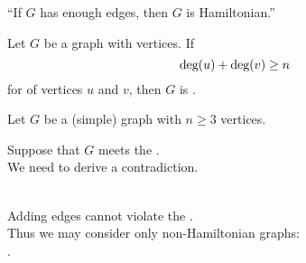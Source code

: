 
\begin{frame}{}

  \begin{center}
    ``If $G$ has enough edges, then $G$ is Hamiltonian.''
  \end{center}
\end{frame}

\begin{frame}{}
  \begin{theorem}
    Let $G$ be a  graph with  vertices. If
    \[
      \text{deg}(u) + \text{deg}(v) \ge n
    \]
    for  of  vertices $u$ and $v$,
    then $G$ is .
  \end{theorem}

  \pause
\end{frame}

\begin{frame}{}
  \begin{center}

    \pause
    \vspace{0.30cm}
    Let $G$ be a  (simple) graph with $n \ge 3$ vertices.

    \pause
    \vspace{0.30cm}
    Suppose that $G$ meets the . \\[3pt]
    We need to derive a contradiction.

    \pause
    \vspace{0.80cm}
     \\[3pt] \pause
    Adding edges cannot violate the . \\[3pt] \pause
    Thus we may consider only  non-Hamiltonian graphs: \\[3pt]
    .
  \end{center}
\end{frame}

